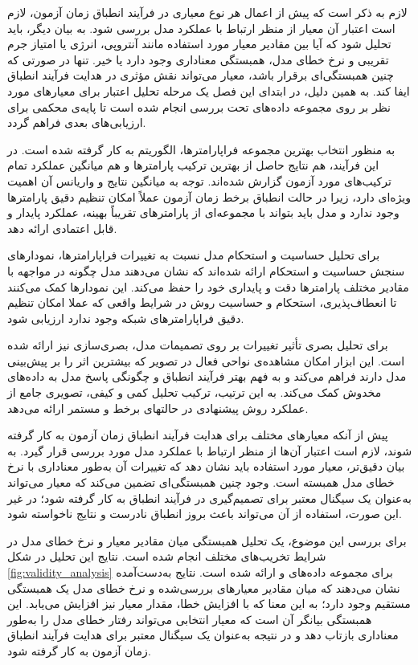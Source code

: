لازم به ذکر است که پیش از اعمال هر نوع معیاری در فرآیند انطباق زمان آزمون، لازم است اعتبار آن معیار از منظر ارتباط با عملکرد مدل بررسی شود. به بیان دیگر، باید تحلیل شود که آیا بین مقادیر معیار مورد استفاده مانند آنتروپی، انرژی یا امتیاز جرم تقریبی و نرخ خطای مدل، همبستگی معناداری وجود دارد یا خیر. تنها در صورتی که چنین همبستگی‌ای برقرار باشد، معیار می‌تواند نقش مؤثری در هدایت فرآیند انطباق ایفا کند. به همین دلیل، در ابتدای این فصل یک مرحله تحلیل اعتبار برای معیارهای مورد نظر بر روی مجموعه داده‌های تحت بررسی انجام شده است تا پایه‌ی محکمی برای ارزیابی‌های بعدی فراهم گردد.

به منظور انتخاب بهترین مجموعه فراپارامترها، الگوریتم  به کار گرفته شده است. در این فرآیند، هم نتایج حاصل از بهترین ترکیب پارامترها و هم میانگین عملکرد تمام ترکیب‌های مورد آزمون گزارش شده‌اند. توجه به میانگین نتایج و واریانس آن اهمیت ویژه‌ای دارد، زیرا در حالت انطباق برخط زمان آزمون عملاً امکان تنظیم دقیق پارامترها وجود ندارد و مدل باید بتواند با مجموعه‌ای از پارامترهای تقریباً بهینه، عملکرد پایدار و قابل اعتمادی ارائه دهد.

برای تحلیل حساسیت و استحکام مدل نسبت به تغییرات فراپارامترها، نمودارهای سنجش حساسیت و استحکام ارائه شده‌اند که نشان می‌دهند مدل چگونه در مواجهه با مقادیر مختلف پارامترها دقت و پایداری خود را حفظ می‌کند. این نمودارها کمک می‌کنند تا انعطاف‌پذیری، استحکام و حساسیت روش در شرایط واقعی که عملا امکان تنظیم دقیق فراپارامتر‌های شبکه وجود ندارد ارزیابی شود.

برای تحلیل بصری تأثیر تغییرات بر روی تصمیمات مدل، بصری‌سازی \cite{gradcam} نیز ارائه شده است. این ابزار امکان مشاهده‌ی نواحی فعال در تصویر که بیشترین اثر را بر پیش‌بینی مدل دارند فراهم می‌کند و به فهم بهتر فرآیند انطباق و چگونگی پاسخ مدل به داده‌های مخدوش کمک می‌کند. به این ترتیب، ترکیب تحلیل کمی و کیفی، تصویری جامع از عملکرد روش پیشنهادی در حالتهای برخط و مستمر ارائه می‌دهد.


پیش از آنکه معیارهای مختلف برای هدایت فرآیند انطباق زمان آزمون به کار گرفته شوند، لازم است اعتبار آن‌ها از منظر ارتباط با عملکرد مدل مورد بررسی قرار گیرد. به بیان دقیق‌تر، معیار مورد استفاده باید نشان دهد که تغییرات آن به‌طور معناداری با نرخ خطای مدل همبسته است. وجود چنین همبستگی‌ای تضمین می‌کند که معیار می‌تواند به‌عنوان یک سیگنال معتبر برای تصمیم‌گیری در فرآیند انطباق به کار گرفته شود؛ در غیر این صورت، استفاده از آن می‌تواند باعث بروز انطباق نادرست و نتایج ناخواسته شود.

برای بررسی این موضوع، یک تحلیل همبستگی میان مقادیر معیار و نرخ خطای مدل در شرایط تخریب‌های مختلف انجام شده است. نتایج این تحلیل در شکل \ref{fig:validity_analysis} برای مجموعه داده‌های  و  ارائه شده است. نتایج به‌دست‌آمده نشان می‌دهند که میان مقادیر معیارهای بررسی‌شده و نرخ خطای مدل یک همبستگی مستقیم وجود دارد؛ به این معنا که با افزایش خطا، مقدار معیار نیز افزایش می‌یابد. این همبستگی بیانگر آن است که معیار انتخابی می‌تواند رفتار خطای مدل را به‌طور معناداری بازتاب دهد و در نتیجه به‌عنوان یک سیگنال معتبر برای هدایت فرآیند انطباق زمان آزمون به کار گرفته شود.

